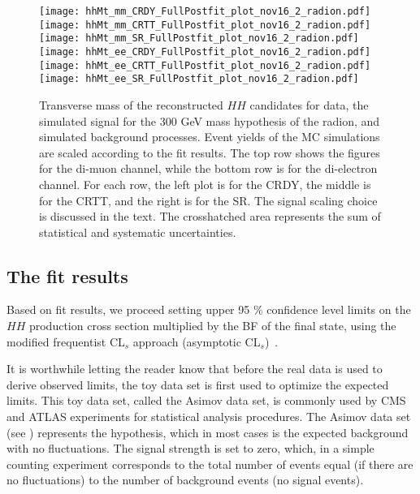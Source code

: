 \begin{figure}[H]
\begin{center}
\texttt{[image: hhMt\_mm\_CRDY\_FullPostfit\_plot\_nov16\_2\_radion.pdf]}
\texttt{[image: hhMt\_mm\_CRTT\_FullPostfit\_plot\_nov16\_2\_radion.pdf]}
\texttt{[image: hhMt\_mm\_SR\_FullPostfit\_plot\_nov16\_2\_radion.pdf]} \\
\texttt{[image: hhMt\_ee\_CRDY\_FullPostfit\_plot\_nov16\_2\_radion.pdf]}
\texttt{[image: hhMt\_ee\_CRTT\_FullPostfit\_plot\_nov16\_2\_radion.pdf]}
\texttt{[image: hhMt\_ee\_SR\_FullPostfit\_plot\_nov16\_2\_radion.pdf]}
\caption[Transverse mass of the reconstructed $HH$ candidates for radion hypothesis.]{Transverse mass of the reconstructed $HH$ candidates for data, the simulated signal for the 300 GeV mass hypothesis of the radion, and simulated background processes. Event yields of the MC simulations are scaled according to the fit results. The top row shows the figures for the di-muon channel, while the bottom row is for the di-electron channel. For each row, the left plot is for the CRDY, the middle is for the CRTT, and the right is for the SR. The signal scaling choice is discussed in the text. The crosshatched area represents the sum of statistical and systematic uncertainties.}
\label{MCcomparisons_radion} 
\end{center}
\end{figure}

\subsection{The fit results}
\label{sec:fit_results}

Based on fit results, we proceed setting upper 95 \% confidence level limits on the $HH$ production cross section multiplied by the BF of the final state, using the modified frequentist CL$_s$ approach (asymptotic CL$_s$)~\cite{Junk:1999kv,LEP-CLs, HIG-11-011, Cowan:2010js}.

It is worthwhile letting the reader know that before the real data is used to derive observed limits, the toy data set is first used to optimize the expected limits. This toy data set, called the Asimov data set, is commonly used by CMS and ATLAS experiments for statistical analysis procedures. The Asimov data set (see \cite{Cowan:2010js}) represents the hypothesis, which in most cases is the expected background with no fluctuations. The signal strength is set to zero, which, in a simple counting experiment \cite{expected_limit_asimov} corresponds to the total number of events equal (if there are no fluctuations) to the number of background events (no signal events). 

